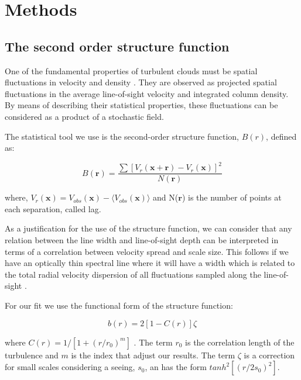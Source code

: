 \documentclass[fleqn,usenatbib, useAMS, a4paper]{mnras}
\begin{document}
\section{Methods}\label{sec:met}

\subsection{The second order structure function}

One of the fundamental properties of turbulent clouds must be spatial fluctuations in velocity and density \citep{1984ApJ...277..556S}. They are observed as projected spatial fluctuations in the average line-of-sight velocity and integrated column density. By means of describing their statistical properties, these fluctuations can be considered as a product of a stochastic  field.

The statistical tool we use is the second-order structure function, $B(r)$, defined as:

\begin{equation}\label{eq:S}
B(\boldsymbol{r})=\dfrac{\sum[V_{r}(\boldsymbol{x}+\boldsymbol{r})-V_{r}(\boldsymbol{x}) ]^{2}}{N(\boldsymbol{r})}
\end{equation}

where, $V_{r}(\boldsymbol{x})= V_{obs}(\boldsymbol{x})-\langle V_{obs}(\boldsymbol{x}) \rangle$ and N($\boldsymbol{r}$) is the number of points at each separation, called lag. 

As a justification for the use of the structure function, we can consider that any relation between the line width and line-of-sight depth can be interpreted in terms of a correlation between velocity spread and scale size. This follows if we have an optically thin spectral line where it will have a width which is related to the total radial velocity dispersion of all fluctuations sampled along the line-of-sight \citep{1984ApJ...277..556S}.

For our fit we use the functional form of the structure function:

\begin{equation}\label{eq:b}
b(r)=2[1-C(r)]\zeta
\end{equation}

where $C(r)=1/[1+(r/r_{0})^{m}]$ \citep{1984ApJ...277..556S,arthur2016turbulence}. The term $r_{0}$ is the correlation length of the turbulence and $m$ is the index that adjust our results. The term $\zeta$ is a correction for small scales considering a seeing, $s_{0}$, an has the form $tanh^{2}[(r/2s_{0})^2]$.
\end{document}
